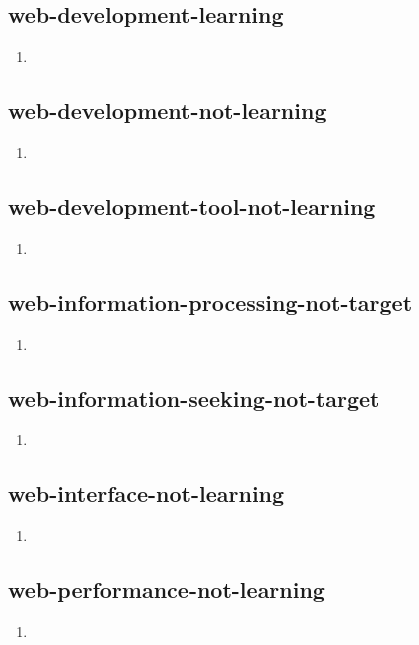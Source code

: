\documentclass{article}
\begin{document}
\subsection{web-development-learning}
\begin{enumerate}
\item {}
\end{enumerate}

\subsection{web-development-not-learning}
\begin{enumerate}
\item {}
\end{enumerate}

\subsection{web-development-tool-not-learning}
\begin{enumerate}
\item {}
\end{enumerate}

\subsection{web-information-processing-not-target}
\begin{enumerate}
\item {}
\end{enumerate}

\subsection{web-information-seeking-not-target}
\begin{enumerate}
\item {}
\end{enumerate}

\subsection{web-interface-not-learning}
\begin{enumerate}
\item {}
\end{enumerate}

\subsection{web-performance-not-learning}
\begin{enumerate}
\item {}
\end{enumerate}
\end{document}

